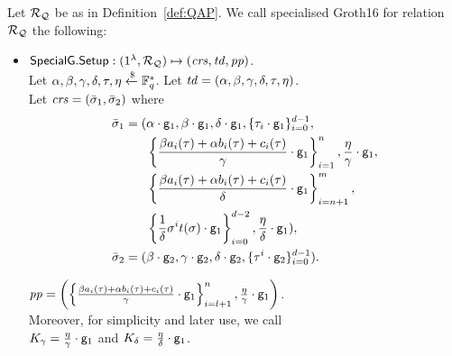 \begin{definition}
\label{insta:sg16} Let $\mathcal{R}_{\mathcal{Q}}$ be as in Definition~\ref{def:QAP}. We call 
specialised Groth16 for relation $\mathcal{R}_{\mathcal{Q}}$ the following: %
\begin{itemize}
\item ${\mathsf{SpecialG}}.{\mathsf{Setup}}: (1^{\lambda}, \mathcal{R}_{\mathcal{Q}}) \mapsto (\mathit{crs}, \mathit{td},\mathit{pp})$. \\ 
\noindent Let $\alpha, \beta, \gamma, \delta, \tau, \eta  \xleftarrow{\$} \mathbb{F}_q^{*}$. 
Let $\mathit{td} = (\alpha, \beta, \gamma, \delta, \tau, \eta)$. \\ 
Let $\mathit{crs} = (\bar{\sigma}_1, \bar{\sigma}_2)$ where 
\begin{align*}
\bar{\sigma}_1 = (&\alpha \cdot \mathsf{g}_1, \beta \cdot \mathsf{g}_1, \delta \cdot \mathsf{g}_1, \{\tau_i \cdot \mathsf{g}_1\}_{i=0}^{d-1}, \\
& \left\{\frac{\beta a_i(\tau)+ \alpha b_i(\tau)+ c_i(\tau)}{\gamma} \cdot \mathsf{g}_1 \right\}_{i=1}^n, \frac{\eta}{\gamma} \cdot \mathsf{g}_1, \\ 
&\left\{\frac{\beta a_i(\tau)+ \alpha b_i(\tau)+ c_i(\tau)}{\delta} \cdot \mathsf{g}_1 \right\}_{i=n+1}^m, \\
& \left\{\frac{1}{\delta}\sigma^it(\sigma)\cdot \mathsf{g}_1 \right\}_{i=0}^{d-2}, \frac{\eta}{\delta}\cdot \mathsf{g}_1), \\
\bar{\sigma}_2 = (&\beta \cdot \mathsf{g}_2, \gamma \cdot \mathsf{g}_2, \delta \cdot \mathsf{g}_2, \{\tau^i \cdot \mathsf{g}_2\}_{i=0}^{d-1}). 
\end{align*} 

$\mathit{pp} = \left( \left \{ \frac{\beta a_i(\tau)+ \alpha b_i(\tau)+ c_i(\tau)}{\gamma} \cdot \mathsf{g}_1 \right \}_{i=l+1}^{n}, \frac{\eta}{\gamma} \cdot \mathsf{g}_1 \right)$. \\
\noindent Moreover, for simplicity and later use, we call \\
$K_{\gamma} = \frac{\eta}{\gamma} \cdot \mathsf{g}_1$  and $K_{\delta} = \frac{\eta}{\delta} \cdot \mathsf{g}_1$.


\end{itemize}
\end{definition}
